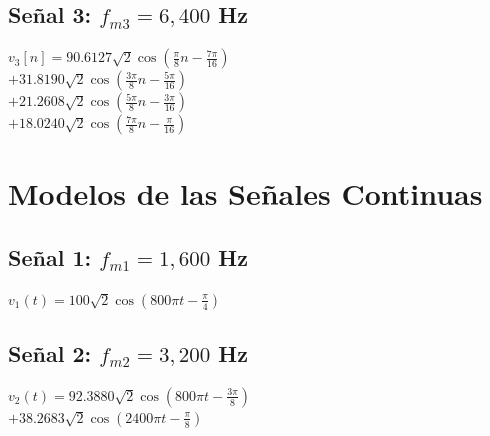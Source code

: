 \documentclass[conference]{IEEEtran}
\theoremstyle{mytheoremstyle}
\theoremstyle{mytheoremstyle}
\theoremstyle{myproblemstyle}
\begin{document}
        \subsection{Señal 3: \texorpdfstring{$f_{m3} = 6,400$ Hz}{f_m3 = 6,400 Hz}}
        \begin{center}
            $v_3[n]=\displaystyle 90.6127\sqrt{2}\cos\left(\frac{\pi}{8}n-\frac{7\pi}{16}\right)$ \\ 
            \vspace{0.2cm}
            $+31.8190\sqrt{2}\cos\left(\frac{3\pi}{8}n-\frac{5\pi}{16}\right)$ \\ 
            \vspace{0.2cm}
            $+21.2608\sqrt{2}\cos\left(\frac{5\pi}{8}n-\frac{3\pi}{16}\right)$ \\ 
            \vspace{0.2cm}
            $+18.0240\sqrt{2}\cos\left(\frac{7\pi}{8}n-\frac{\pi}{16}\right)$
        \end{center}

        \section{Modelos de las Señales Continuas}
        \subsection{Señal 1: $f_{m1} = 1,600$ Hz}
        \begin{center}
            $v_1(t)= \displaystyle  100\sqrt{2} \cos\left(800\pi t-\frac{\pi}{4} \right)$
        \end{center}

        \subsection{Señal 2: $f_{m2} = 3,200$ Hz}
        \begin{center}
            $v_2(t)= \displaystyle  92.3880 \sqrt{2} \cos\left(800\pi t-\frac{3\pi}{8}\right)$ \\ 
            \vspace{0.2cm}
            $+38.2683 \sqrt{2} \cos\left(2400\pi t-\frac{\pi}{8}\right)$
        \end{center}
\end{document}

